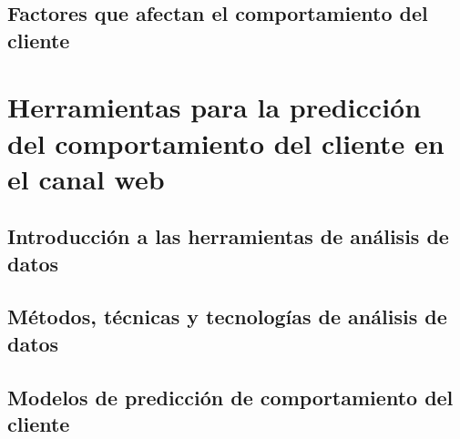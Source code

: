 \documentclass{report}
\begin{document}
\subsection{Factores que afectan el comportamiento del cliente}


\section{Herramientas para la predicción del comportamiento del cliente en el canal web}

\subsection{Introducción a las herramientas de análisis de datos}


\subsection{Métodos, técnicas y tecnologías de análisis de datos}


\subsection{Modelos de predicción de comportamiento del cliente}






\end{document}
